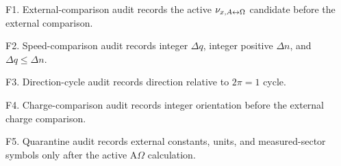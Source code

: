 F1. External-comparison audit records the active \(\nu_{x,A{\leftrightarrow}\Omega}\) candidate before the external comparison.

F2. Speed-comparison audit records integer \(\Delta q\), integer positive \(\Delta n\), and \(\Delta q\le\Delta n\).

F3. Direction-cycle audit records direction relative to \(2\pi=1\) cycle.

F4. Charge-comparison audit records integer orientation before the external charge comparison.

F5. Quarantine audit records external constants, units, and measured-sector symbols only after the active A\(\Omega\) calculation.



